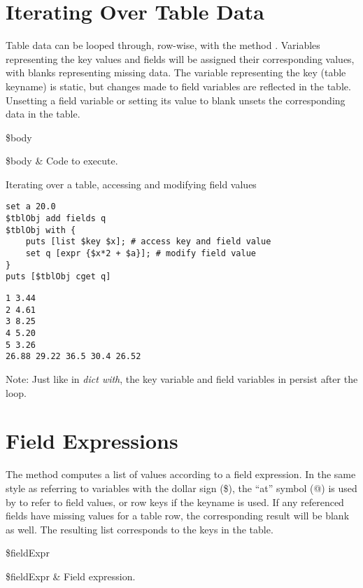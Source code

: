 \section{Iterating Over Table Data}
Table data can be looped through, row-wise, with the method . 
Variables representing the key values and fields will be assigned their corresponding values, with blanks representing missing data. 
The variable representing the key (table keyname) is static, but changes made to field variables are reflected in the table. 
Unsetting a field variable or setting its value to blank unsets the corresponding data in the table. 
\begin{syntax}
 \$body
\end{syntax}
\begin{args}
\$body & Code to execute.
\end{args}
\begin{example}{Iterating over a table, accessing and modifying field values}
\begin{lstlisting}
set a 20.0
$tblObj add fields q
$tblObj with {
    puts [list $key $x]; # access key and field value
    set q [expr {$x*2 + $a}]; # modify field value
}
puts [$tblObj cget q]
\end{lstlisting}
\tcblower
\begin{lstlisting}
1 3.44
2 4.61
3 8.25
4 5.20
5 3.26
26.88 29.22 36.5 30.4 26.52
\end{lstlisting}
\end{example}
Note: Just like in \textit{dict with}, the key variable and field variables in  persist after the loop.
\clearpage
\section{Field Expressions}
The method  computes a list of values according to a field expression. 
In the same style as referring to variables with the dollar sign (\$), the ``at'' symbol (@) is used by  to refer to field values, or row keys if the keyname is used. 
If any referenced fields have missing values for a table row, the corresponding result will be blank as well. 
The resulting list corresponds to the keys in the table.
\begin{syntax}
 \$fieldExpr
\end{syntax}
\begin{args}
\$fieldExpr & Field expression.
\end{args}
